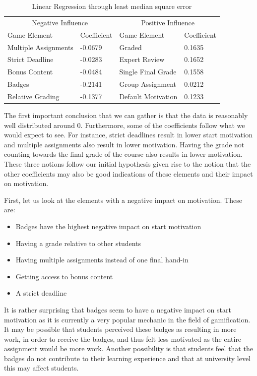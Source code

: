 \documentclass[11pt]{article}
\newcommand{\ra}[1]{\renewcommand{\arraystretch}{#1}}
\begin{document}
\begin{table}[h!t]\centering
\ra{1.3}
\footnotesize
\begin{tabular}{@{}llll@{}}
\toprule
\multicolumn{2}{c}{Negative Influence} & \multicolumn{2}{c}{Positive Influence} \\
Game Element & Coefficient &  Game Element& Coefficient  \\ 
\cmidrule(r){1-2}
\cmidrule(r){3-4}
Multiple Assignments 	& -0.0679 	& Graded 		& 0.1635 \\
Strict Deadline 	& -0.0283 	& Expert Review 	& 0.1652 \\
Bonus Content 		& -0.0484 	& Single Final Grade 	& 0.1558 \\
Badges 			& -0.2141 	& Group Assignment 	& 0.0212 \\
Relative Grading 	& -0.1377 	& Default Motivation	& 0.1233\\
\bottomrule
\end{tabular}
\caption{Linear Regression through least median square error}
\label{lmsreg}
\end{table}


The first important conclusion that we can gather is that the data is reasonably well distributed around $0$. Furthermore, some of the coefficients follow what we would expect to see. For instance, strict deadlines result in lower start motivation and multiple assignments also result in lower motivation. Having the grade not counting towards the final grade of the course also results in lower motivation. These three notions follow our initial hypothesis given rise to the notion that the other coefficients may also be good indications of these elements and their impact on motivation.

First, let us look at the elements with a negative impact on motivation. These are:
\begin{itemize}
  \item Badges have the highest negative impact on start motivation
  \item Having a grade relative to other students
  \item Having multiple assignments instead of one final hand-in
  \item Getting access to bonus content
  \item A strict deadline
\end{itemize}

It is rather surprising that badges seem to have a negative impact on start motivation as it is currently a very popular mechanic in the field of gamification. It may be possible that students perceived these badges as resulting in more work, in order to receive the badges, and thus felt less motivated as the entire assignment would be more work. Another possibility is that students feel that the badges do not contribute to their learning experience and that at university level this may affect students.
\end{document}
